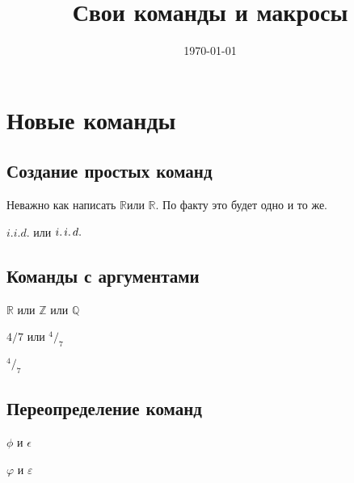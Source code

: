 \documentclass[12pt, a4paper]{article}
\title{Свои команды и макросы}
\date{\today}
\theoremstyle{plain}              %
\theoremstyle{definition}         %
\begin{document}
\maketitle


\section{Новые команды}
\subsection{Создание простых команд}


\def \a{\alpha}
\def \R{\ensuremath{\mathbb{R}}} 


\newcommand{\RR}{\ensuremath{\mathbb{R}}}

Неважно как написать \R или \RR. По факту это будет одно и то же.


\newcommand{\iid}{i.\hspace{1.5pt}i.\hspace{1.5pt}d.}

$i.i.d.$ или $\iid$

\subsection{Команды с аргументами}

\newcommand{\bb}[1]{\ensuremath{\mathbb{#1}} }

\bb{R} или \bb{Z} или \bb{Q}


$4/7$ или $^4/_7$

\newcommand{\fr}[2]{^#1/_#2}

$\fr{4}{7}$


\subsection{Переопределение команд}

$ \phi $ и $ \epsilon $

\renewcommand{\phi}{\varphi}
\renewcommand{\epsilon}{\varepsilon}

$ \phi $ и $ \epsilon $
\end{document}
